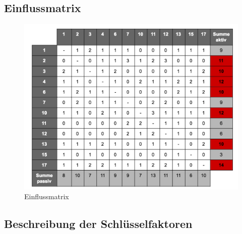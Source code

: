 \subsection{Einflussmatrix}

\begin{figure}
	\centering
	\includegraphics[width=\linewidth]{images/matrix}
	\caption[Caption for parameters]{Einflussmatrix}
	\label{fig:matrix}
\end{figure}

\subsection{Beschreibung der Schlüsselfaktoren}